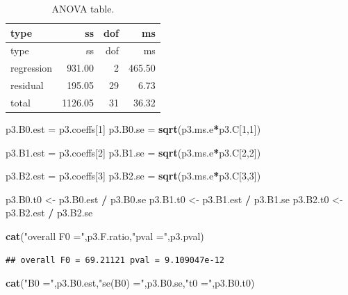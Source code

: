 \documentclass[
]{article}
\newenvironment{Shaded}{\begin{snugshade}}{\end{snugshade}}
\newcommand{\DecValTok}[1]{\textcolor[rgb]{0.00,0.00,0.81}{#1}}
\newcommand{\FunctionTok}[1]{\textcolor[rgb]{0.13,0.29,0.53}{\textbf{#1}}}
\newcommand{\NormalTok}[1]{#1}
\newcommand{\OtherTok}[1]{\textcolor[rgb]{0.56,0.35,0.01}{#1}}
\newcommand{\SpecialCharTok}[1]{\textcolor[rgb]{0.81,0.36,0.00}{\textbf{#1}}}
\newcommand{\StringTok}[1]{\textcolor[rgb]{0.31,0.60,0.02}{#1}}
\begin{document}
\begin{longtable}[]{@{}lrrr@{}}
\caption{ANOVA table.}\tabularnewline
\toprule\noalign{}
type & ss & dof & ms \\
\midrule\noalign{}
\endfirsthead
\toprule\noalign{}
type & ss & dof & ms \\
\midrule\noalign{}
\endhead
\bottomrule\noalign{}
\endlastfoot
regression & 931.00 & 2 & 465.50 \\
residual & 195.05 & 29 & 6.73 \\
total & 1126.05 & 31 & 36.32 \\
\end{longtable}

\begin{Shaded}
\begin{Highlighting}[]
\NormalTok{p3.B0.est }\OtherTok{=}\NormalTok{ p3.coeffs[}\DecValTok{1}\NormalTok{]}
\NormalTok{p3.B0.se }\OtherTok{=} \FunctionTok{sqrt}\NormalTok{(p3.ms.e}\SpecialCharTok{*}\NormalTok{p3.C[}\DecValTok{1}\NormalTok{,}\DecValTok{1}\NormalTok{])}

\NormalTok{p3.B1.est }\OtherTok{=}\NormalTok{ p3.coeffs[}\DecValTok{2}\NormalTok{]}
\NormalTok{p3.B1.se }\OtherTok{=} \FunctionTok{sqrt}\NormalTok{(p3.ms.e}\SpecialCharTok{*}\NormalTok{p3.C[}\DecValTok{2}\NormalTok{,}\DecValTok{2}\NormalTok{])}

\NormalTok{p3.B2.est }\OtherTok{=}\NormalTok{ p3.coeffs[}\DecValTok{3}\NormalTok{]}
\NormalTok{p3.B2.se }\OtherTok{=} \FunctionTok{sqrt}\NormalTok{(p3.ms.e}\SpecialCharTok{*}\NormalTok{p3.C[}\DecValTok{3}\NormalTok{,}\DecValTok{3}\NormalTok{])}

\NormalTok{p3.B0.t0 }\OtherTok{\textless{}{-}}\NormalTok{ p3.B0.est }\SpecialCharTok{/}\NormalTok{ p3.B0.se}
\NormalTok{p3.B1.t0 }\OtherTok{\textless{}{-}}\NormalTok{ p3.B1.est }\SpecialCharTok{/}\NormalTok{ p3.B1.se}
\NormalTok{p3.B2.t0 }\OtherTok{\textless{}{-}}\NormalTok{ p3.B2.est }\SpecialCharTok{/}\NormalTok{ p3.B2.se}


\FunctionTok{cat}\NormalTok{(}\StringTok{"overall F0 ="}\NormalTok{,p3.F.ratio,}\StringTok{"pval ="}\NormalTok{,p3.pval)}
\end{Highlighting}
\end{Shaded}

\begin{verbatim}
## overall F0 = 69.21121 pval = 9.109047e-12
\end{verbatim}

\begin{Shaded}
\begin{Highlighting}[]
\FunctionTok{cat}\NormalTok{(}\StringTok{"B0 ="}\NormalTok{,p3.B0.est,}\StringTok{"se(B0) ="}\NormalTok{,p3.B0.se,}\StringTok{"t0 ="}\NormalTok{,p3.B0.t0)}
\end{Highlighting}
\end{Shaded}
\end{document}
